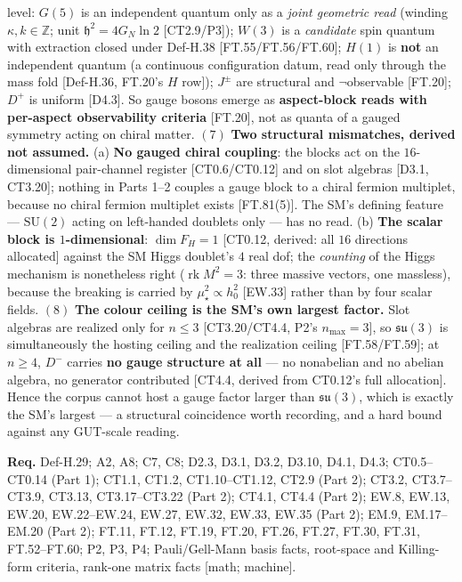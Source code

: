 \begin{theorem}
level: $G(5)$ is an independent quantum only as a \textit{joint geometric read} (winding $\kappa,k\in\mathbb Z$; unit $\mathfrak h^2=4G_N\ln2$ [CT2.9/P3]); $W(3)$ is a \textit{candidate} spin quantum with extraction closed under Def-H.38 [FT.55/FT.56/FT.60]; $H(1)$ is \textbf{not} an independent quantum (a continuous configuration datum, read only through the mass fold [Def-H.36, FT.20's $H$ row]); $J^\pm$ are structural and $\neg$observable [FT.20]; $D^+$ is uniform [D4.3]. So gauge bosons emerge as \textbf{aspect-block reads with per-aspect observability criteria} [FT.20], not as quanta of a gauged symmetry acting on chiral matter. $(7)$ \textbf{Two structural mismatches, derived not assumed.} (a) \textbf{No gauged chiral coupling}: the blocks act on the $16$-dimensional pair-channel register [CT0.6/CT0.12] and on slot algebras [D3.1, CT3.20]; nothing in Parts 1–2 couples a gauge block to a chiral fermion multiplet, because no chiral fermion multiplet exists [FT.81(5)]. The SM's defining feature — $\mathrm{SU}(2)$ acting on left-handed doublets only — has no read. (b) \textbf{The scalar block is $1$-dimensional}: $\dim F_H=1$ [CT0.12, derived: all $16$ directions allocated] against the SM Higgs doublet's $4$ real dof; the \textit{counting} of the Higgs mechanism is nonetheless right ($\operatorname{rk}M^2=3$: three massive vectors, one massless), because the breaking is carried by $\mu_\star^2\propto h_0^2$ [EW.33] rather than by four scalar fields. $(8)$ \textbf{The colour ceiling is the SM's own largest factor.} Slot algebras are realized only for $n\le3$ [CT3.20/CT4.4, P2's $n_{\max}=3$], so $\mathfrak{su}(3)$ is simultaneously the hosting ceiling and the realization ceiling [FT.58/FT.59]; at $n\ge4$, $D^-$ carries \textbf{no gauge structure at all} — no nonabelian and no abelian algebra, no generator contributed [CT4.4, derived from CT0.12's full allocation]. Hence the corpus cannot host a gauge factor larger than $\mathfrak{su}(3)$, which is exactly the SM's largest — a structural coincidence worth recording, and a hard bound against any GUT-scale reading.

\textbf{Req.} Def-H.29; A2, A8; C7, C8; D2.3, D3.1, D3.2, D3.10, D4.1, D4.3; CT0.5–CT0.14 (Part 1); CT1.1, CT1.2, CT1.10–CT1.12, CT2.9 (Part 2); CT3.2, CT3.7–CT3.9, CT3.13, CT3.17–CT3.22 (Part 2); CT4.1, CT4.4 (Part 2); EW.8, EW.13, EW.20, EW.22–EW.24, EW.27, EW.32, EW.33, EW.35 (Part 2); EM.9, EM.17–EM.20 (Part 2); FT.11, FT.12, FT.19, FT.20, FT.26, FT.27, FT.30, FT.31, FT.52–FT.60; P2, P3, P4; Pauli/Gell-Mann basis facts, root-space and Killing-form criteria, rank-one matrix facts [math; machine].


\end{theorem}
